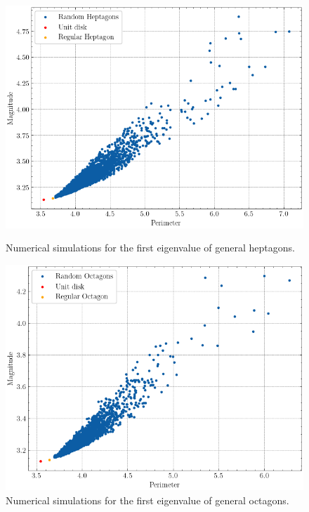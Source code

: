 \begin{figure}[!htb]
    \vspace{0.5cm}

    \begin{minipage}[b]{0.45\textwidth}
        \centering
        \includegraphics[width=1\textwidth]{Images/Dirac/Polygons/heptagons.png}
    \caption{Numerical simulations for the first eigenvalue of general heptagons.}
    \label{dirac_polya_szego_evidence_heptagons}
    \end{minipage}
    \hfill
    \begin{minipage}[b]{0.45\textwidth}
        \centering
        \includegraphics[width=1\textwidth]{Images/Dirac/Polygons/octagons.png}
    \caption{Numerical simulations for the first eigenvalue of general octagons.}
    \label{dirac_polya_szego_evidence_octagons}
    \end{minipage}
\end{figure}

